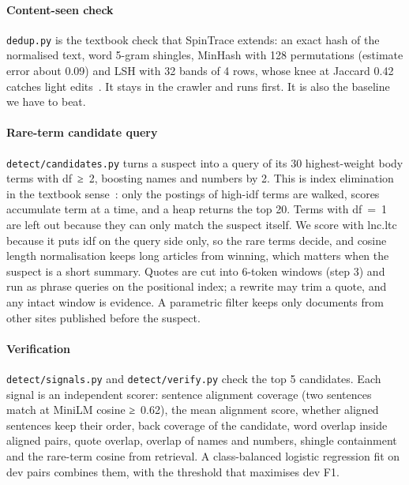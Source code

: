 \documentclass[11pt,a4paper]{article}
\newcommand{\code}[1]{\texttt{#1}}
\begin{document}
\paragraph{Content-seen check} \code{dedup.py} is the textbook check that SpinTrace extends: an exact hash of the normalised text, word 5-gram shingles, MinHash with 128 permutations (estimate error about 0.09) and LSH with 32 bands of 4 rows, whose knee at Jaccard 0.42 catches light edits~\cite{broder1997,iir2008}. It stays in the crawler and runs first. It is also the baseline we have to beat.

\paragraph{Rare-term candidate query} \code{detect/candidates.py} turns a suspect into a query of its 30 highest-weight body terms with df~≥~2, boosting names and numbers by 2. This is index elimination in the textbook sense~\cite[ch.~7]{iir2008}: only the postings of high-idf terms are walked, scores accumulate term at a time, and a heap returns the top 20. Terms with df~=~1 are left out because they can only match the suspect itself. We score with lnc.ltc because it puts idf on the query side only, so the rare terms decide, and cosine length normalisation keeps long articles from winning, which matters when the suspect is a short summary. Quotes are cut into 6-token windows (step 3) and run as phrase queries on the positional index; a rewrite may trim a quote, and any intact window is evidence. A parametric filter keeps only documents from other sites published before the suspect.

\paragraph{Verification} \code{detect/signals.py} and \code{detect/verify.py} check the top 5 candidates. Each signal is an independent scorer: sentence alignment coverage (two sentences match at MiniLM cosine ≥~0.62), the mean alignment score, whether aligned sentences keep their order, back coverage of the candidate, word overlap inside aligned pairs, quote overlap, overlap of names and numbers, shingle containment and the rare-term cosine from retrieval. A class-balanced logistic regression fit on dev pairs combines them, with the threshold that maximises dev F1.
\end{document}
